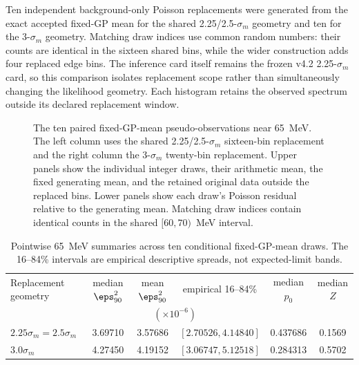 Ten independent background-only Poisson replacements were generated from the
exact accepted fixed-GP mean for the shared 2.25/2.5-$\sigma_m$ geometry and
ten for the 3-$\sigma_m$ geometry.  Matching draw indices use common random
numbers: their counts are identical in the sixteen shared bins, while the
wider construction adds four replaced edge bins.  The inference card itself
remains the frozen v4.2 2.25-$\sigma_m$ card, so this comparison isolates
replacement scope rather than simultaneously changing the likelihood
geometry.  Each histogram retains the observed spectrum outside its declared
replacement window.

\begin{figure}[H]
\centering
{}
\caption{The ten paired fixed-GP-mean pseudo-observations near 65~MeV.
The left column uses the shared 2.25/2.5-$\sigma_m$ sixteen-bin replacement
and the right column the 3-$\sigma_m$ twenty-bin replacement.  Upper panels
show the individual integer draws, their arithmetic mean, the fixed
generating mean, and the retained original data outside the replaced bins.
Lower panels show each draw's Poisson residual relative to the generating
mean.  Matching draw indices contain identical counts in the shared
$[60,70)$~MeV interval.}
\label{fig:appendix-v4p2-gp-window-spectra}
\end{figure}

\begin{table}[H]
\centering
\small
\caption{Pointwise 65~MeV summaries across ten conditional fixed-GP-mean
draws.  The 16--84\% intervals are empirical descriptive spreads, not
expected-limit bands.}
\label{tab:v4p2-pseudo65-gp-ensemble-m065}
\begin{tabular}{lccccc}
\toprule
Replacement geometry & median $\eps^2_{90}$ & mean $\eps^2_{90}$ &
empirical 16--84\% & median $p_0$ & median $Z$ \\
 & \multicolumn{3}{c}{$(\times10^{-6})$} & & \\
\midrule
$2.25\sigma_m=2.5\sigma_m$ & 3.69710 & 3.57686 &
$[2.70526,4.14840]$ & 0.437686 & 0.1569 \\
$3.0\sigma_m$ & 4.27450 & 4.19152 &
$[3.06747,5.12518]$ & 0.284313 & 0.5702 \\
\bottomrule
\end{tabular}
\end{table}

